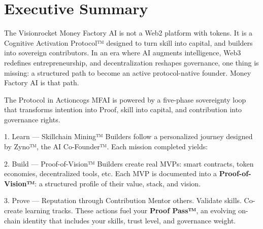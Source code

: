 
\section{Executive Summary}

\begin{mfai-box}{The Vision}{rocket}
Money Factory AI is not a Web2 platform with tokens. It is a Cognitive Activation Protocol™ designed to turn skill into capital, and builders into sovereign contributors.  
In an era where AI augments intelligence, Web3 redefines entrepreneurship, and decentralization reshapes governance, one thing is missing: a structured path to become an active protocol-native founder.  
Money Factory AI is that path.
\end{mfai-box}


\begin{mfai-box}{The Protocol in Action}{cogs}
MFAI is powered by a five-phase sovereignty loop that transforms intention into Proof, skill into capital, and contribution into governance rights.
\end{mfai-box}

\begin{mfai-phase}{1. Learn — Skillchain Mining™}
Builders follow a personalized journey designed by Zyno™, the AI Co-Founder™.  
Each mission completed yields:
\end{mfai-phase}

\begin{mfai-phase}{2. Build — Proof-of-Vision™}
Builders create real MVPs: smart contracts, token economies, decentralized tools, etc.  
Each MVP is documented into a \textbf{Proof-of-Vision™}: a structured profile of their value, stack, and vision.
\end{mfai-phase}

\begin{mfai-phase}{3. Prove — Reputation through Contribution}
Mentor others. Validate skills. Co-create learning tracks.  
These actions fuel your \textbf{Proof Pass™}, an evolving on-chain identity that includes your skills, trust level, and governance weight.
\end{mfai-phase}

